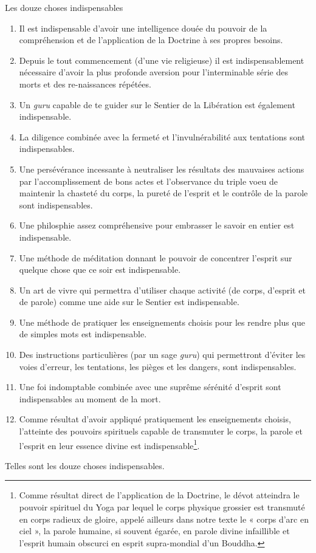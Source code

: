 \documentclass[10pt]{book}
\makeatletter
\renewcommand{\section}{\@startsection{section}{0}{0mm}
   {\baselineskip}
   {\baselineskip}{\normalfont\normalsize\scshape\centering}
}
\makeatother
\begin{document}
\section{Les douze choses indispensables}
\begin{enumerate}[1.-]
\item Il est indispensable d'avoir une intelligence douée du pouvoir de la compréhension et de l'application de la Doctrine à ses propres besoins.
\item Depuis le tout commencement (d'une vie religieuse) il est indispensablement nécessaire d'avoir la plus profonde aversion pour l'interminable série des morts et des re-naissances répétées.
\item Un \textit{guru} capable de te guider sur le Sentier de la Libération est également indispensable.
\item La diligence combinée avec la fermeté et l'invulnérabilité aux tentations sont indispensables.
\item Une persévérance incessante à neutraliser les résultats des mauvaises actions par l'accomplissement de bons actes et l'observance du triple voeu de maintenir la chasteté du corps, la pureté de l'esprit et le contrôle de la parole sont indispensables.
\item Une philosphie assez compréhensive pour embrasser le savoir en entier est indispensable.
\item Une méthode de méditation donnant le pouvoir de concentrer l'esprit sur quelque chose que ce soir est indispensable.
\item Un art de vivre qui permettra d'utiliser chaque activité (de corps, d'esprit et de parole) comme une aide sur le Sentier est indispensable.
\item Une méthode de pratiquer les enseignements choisis pour les rendre plus que de simples mots est indispensable.
\item Des instructions particulières (par un sage \textit{guru}) qui permettront d'éviter les voies d'erreur, les tentations, les pièges et les dangers, sont indispensables.
\item Une foi indomptable combinée avec une suprême sérénité d'esprit sont indispensables au moment de la mort.
\item Comme résultat d'avoir appliqué pratiquement les enseignements choisis, l'atteinte des pouvoirs spirituels capable de transmuter le corps, la parole et l'esprit en leur essence divine est indispensable\footnote{Comme résultat direct de l'application de la Doctrine, le dévot atteindra le pouvoir spirituel du Yoga par lequel le corps physique grossier est transmuté en corps radieux de gloire, appelé ailleurs dans notre texte le « corps d'arc en ciel », la parole humaine, si souvent égarée, en parole divine infaillible et l'esprit humain obscurci en esprit supra-mondial d'un Bouddha.}.
\end{enumerate}
Telles sont les douze choses indispensables.
\end{document}
